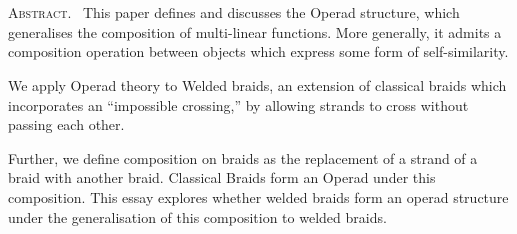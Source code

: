 \thispagestyle{plain}
\begin{center}
    \sc
    \vspace{1cm}
    {\Large \thetitle \\}
    \vspace{0.7cm}
    {\large \theauthor \\}
    \vspace{0.7cm}
    {\thedate}
    \vspace{0.7cm}
\end{center}
\textsc{Abstract.} \, This paper defines and discusses the Operad structure, which generalises the composition of multi-linear functions. 
More generally, it admits a composition operation between objects which express some form of self-similarity.

We apply Operad theory to Welded braids, an extension of classical braids which incorporates an ``impossible crossing,'' by allowing strands to cross without passing each other.

Further, we define composition on braids as the replacement of a strand of a braid with another braid. 
Classical Braids form an Operad under this composition.
This essay explores whether welded braids form an operad structure under the generalisation of this composition to welded braids. 
